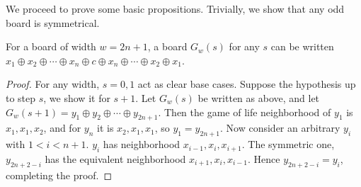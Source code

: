 \documentclass[12pt,letterpaper]{article}
\begin{document}
\noindent We proceed to prove some basic propositions. Trivially, we show that any odd board is symmetrical.
\begin{prop}[Symmetry]\label{symmetry}
  For a board of width $w=2n+1$, a board $G_w(s)$ for any $s$ can be written $x_1\oplus x_2\oplus\cdots\oplus x_n\oplus c \oplus x_n\oplus\cdots\oplus x_2\oplus x_1$.
\end{prop}
\begin{proof}
  For any width, $s=0,1$ act as clear base cases. Suppose the hypothesis up to step $s$, we show it for $s+1$. Let $G_w(s)$ be written as above, and let $G_w(s+1)=y_1\oplus y_2\oplus\cdots\oplus y_{2n+1}$. Then the game of life neighborhood of $y_1$ is $x_1,x_1,x_2$, and for $y_n$ it is $x_2,x_1,x_1$, so $y_1=y_{2n+1}$. Now consider an arbitrary $y_i$ with $1<i<n+1$. $y_i$ has neighborhood $x_{i-1},x_i,x_{i+1}$. The symmetric one, $y_{2n+2-i}$ has the equivalent neighborhood $x_{i+1},x_i,x_{i-1}$. Hence $y_{2n+2-i}=y_i$, completing the proof.
\end{proof}
\end{document}

